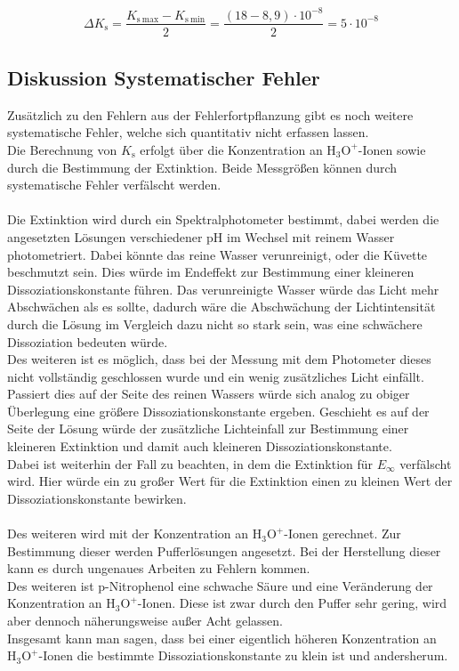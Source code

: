 \documentclass[12pt,a4paper,titlepage,headinclude,bibtotoc]{scrartcl}
\begin{document}
\begin{align}
\Delta K_{\mathrm{s}} = \dfrac{K_{\mathrm{s{~}max}}-K_{\mathrm{s{~}min}}}{2} = \dfrac{(18-8,9) \cdot 10^{-8}}{2}= 5\cdot 10^{-8}
\end{align}


\newpage
\subsection{Diskussion Systematischer Fehler}
Zusätzlich zu den Fehlern aus der Fehlerfortpflanzung gibt es noch weitere systematische Fehler, welche sich quantitativ nicht erfassen lassen.\\
Die Berechnung von $K_{\mathrm{s}}$ erfolgt über die Konzentration an $\mathrm{H_3 O^+}$-Ionen sowie durch die Bestimmung der Extinktion. Beide Messgrößen können durch systematische Fehler verfälscht werden.\\\\
Die Extinktion wird durch ein Spektralphotometer bestimmt, dabei werden die angesetzten Lösungen verschiedener pH im Wechsel mit reinem Wasser photometriert. Dabei könnte das reine Wasser verunreinigt, oder die Küvette beschmutzt sein. Dies würde im Endeffekt zur Bestimmung einer kleineren Dissoziationskonstante führen. Das verunreinigte Wasser würde das Licht mehr Abschwächen als es sollte, dadurch wäre die Abschwächung der Lichtintensität durch die Lösung im Vergleich dazu nicht so stark sein, was eine schwächere Dissoziation bedeuten würde.\\ Des weiteren ist es möglich, dass bei der Messung mit dem Photometer dieses nicht vollständig geschlossen wurde und ein wenig zusätzliches Licht einfällt. Passiert dies auf der Seite des reinen Wassers würde sich analog zu obiger Überlegung eine größere Dissoziationskonstante ergeben. Geschieht es auf der Seite der Lösung würde der zusätzliche Lichteinfall zur Bestimmung einer kleineren Extinktion und damit auch kleineren Dissoziationskonstante.\\ Dabei ist weiterhin der Fall zu beachten, in dem die Extinktion für $E_{\infty}$ verfälscht wird. Hier würde ein zu großer Wert für die Extinktion einen zu kleinen Wert der Dissoziationskonstante bewirken. \\\\
Des weiteren wird mit der Konzentration an $\mathrm{H_3 O^+}$-Ionen gerechnet. Zur Bestimmung dieser werden Pufferlösungen angesetzt. Bei der Herstellung dieser kann es durch ungenaues Arbeiten zu Fehlern kommen.\\ 
Des weiteren ist p-Nitrophenol eine schwache Säure und eine Veränderung der Konzentration an $\mathrm{H_3 O^+}$-Ionen. Diese ist zwar durch den Puffer sehr gering, wird aber dennoch näherungsweise außer Acht gelassen.\\
Insgesamt kann man sagen, dass bei einer eigentlich höheren Konzentration an $\mathrm{H_3 O^+}$-Ionen die bestimmte Dissoziationskonstante zu klein ist und andersherum.\\\\
     
\end{document}
